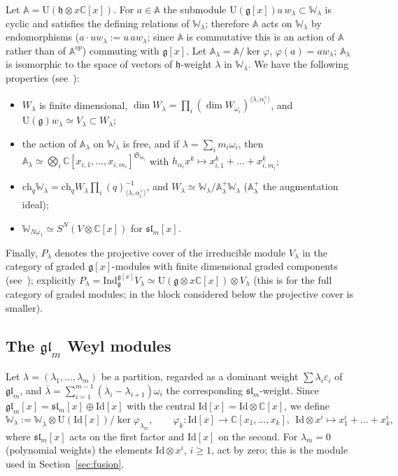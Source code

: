 \documentclass[11pt]{amsart}
\numberwithin{equation}{section}
\theoremstyle{definition}
\newcommand{\gl}{\mathfrak{gl}}
\newcommand{\fg}{\mathfrak{g}}
\newcommand{\fh}{\mathfrak{h}}
\newcommand{\U}{\mathrm{U}}
\newcommand{\bW}{\mathbb{W}}          %
\newcommand{\bA}{\mathbb{A}}          %
\newcommand{\eps}{\varepsilon}
\newcommand{\ch}{\mathrm{ch}}
\begin{document}
	Let $\bA=\U(\fh\otimes x\mathbb{C}[x])$. For $a\in\bA$ the submodule $\U(\fg[x])a\,w_\lambda\subset\bW_\lambda$ is cyclic and satisfies the defining relations of $\bW_\lambda$; therefore $\bA$ acts on $\bW_\lambda$ by endomorphisms ($a\cdot uw_\lambda:=u\,aw_\lambda$; since $\bA$ is commutative this is an action of $\bA$ rather than of $\bA^{op}$) commuting with $\fg[x]$. Let $\bA_\lambda=\bA/\ker\varphi$, $\varphi(a)=aw_\lambda$; $\bA_\lambda$ is isomorphic to the space of vectors of $\fh$-weight $\lambda$ in $\bW_\lambda$. We have the following properties (see~\cite{CFK,FL2,N}):
	\begin{itemize}
		\item $W_\lambda$ is finite dimensional, $\dim W_\lambda=\prod_{i}(\dim W_{\omega_i})^{\langle\lambda,\alpha_i^\vee\rangle}$, and $\U(\fg)w_\lambda\simeq V_\lambda\subset W_\lambda$;
		\item the action of $\bA_\lambda$ on $\bW_\lambda$ is free, and if $\lambda=\sum_im_i\omega_i$, then $\bA_\lambda\simeq\bigotimes_i\mathbb{C}[x_{i,1},\dots,x_{i,m_i}]^{\mathfrak S_{m_i}}$ with $h_{\alpha_i}x^k\mapsto x_{i,1}^k+\dots+x_{i,m_i}^k$;
		\item $\ch_q\bW_\lambda=\ch_qW_\lambda\prod_i(q)^{-1}_{\langle\lambda,\alpha_i^\vee\rangle}$, and $W_\lambda\simeq\bW_\lambda/\bA_\lambda^+\bW_\lambda$ ($\bA_\lambda^+$ the augmentation ideal);
		\item $\bW_{N\omega_1}\simeq S^N(V\otimes\mathbb{C}[x])$ for $\mathfrak{sl}_m[x]$.
	\end{itemize}
	Finally, $P_\lambda$ denotes the projective cover of the irreducible module $V_\lambda$ in the category of graded $\fg[x]$-modules with finite dimensional graded components (see~\cite{BBCKL,CI}); explicitly $P_\lambda=\mathrm{Ind}_\fg^{\fg[x]}V_\lambda\simeq\U(\fg\otimes x\mathbb{C}[x])\otimes V_\lambda$ (this is for the full category of graded modules; in the block considered below the projective cover is smaller).
	
	\subsection{The $\gl_m$ Weyl modules}\label{ssec:app-gl}
	Let $\lambda=(\lambda_1,\dots,\lambda_m)$ be a partition, regarded as a dominant weight $\sum\lambda_i\eps_i$ of $\gl_m$, and $\bar\lambda=\sum_{i=1}^{m-1}(\lambda_i-\lambda_{i+1})\omega_i$ the corresponding $\mathfrak{sl}_m$-weight. Since $\gl_m[x]=\mathfrak{sl}_m[x]\oplus\mathrm{Id}[x]$ with the central $\mathrm{Id}[x]=\mathrm{Id}\otimes\mathbb{C}[x]$, we define
	\[
	\bW_\lambda:=\bW_{\bar\lambda}\otimes\U(\mathrm{Id}[x])/\ker\varphi_{\lambda_m},\qquad\varphi_k\colon\mathrm{Id}[x]\to\mathbb{C}[x_1,\dots,x_k],\ \ \mathrm{Id}\otimes x^i\mapsto x_1^i+\dots+x_k^i,
	\]
	where $\mathfrak{sl}_m[x]$ acts on the first factor and $\mathrm{Id}[x]$ on the second. For $\lambda_m=0$ (polynomial weights) the elements $\mathrm{Id}\otimes x^i$, $i\ge1$, act by zero; this is the module used in Section~\ref{sec:fusion}.
	
\end{document}
